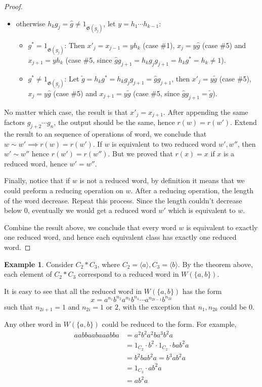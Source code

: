 \documentclass[a4paper]{article}
\theoremstyle{remark}
\theoremstyle{definition}
\newtheorem{example}{Example}
\theoremstyle{definition}
\theoremstyle{plain}
\newcommand{\gid}{\mathfrak{G}}
\begin{document}
\begin{proof}
\begin{itemize}
      \item otherwise $h_k g_j = \hat{g} \neq 1_{\gid(g_j)}$, let $y = h_1 \cdots h_{k-1}$:
        \begin{itemize}
          \item $g^* = 1_{\gid(g_j)}$: Then $x'_j = x_{j-1} = y h_k$ (case \#1), 
            $x_j = y \hat{g}$ (case \#5) and
            $x_{j+1} = y h_k$ (case \#5, since $\hat{g} g_{j+1} = h_k g_j g_{j+1} = h_k g^* = h_k \neq 1$). 
          \item $g^* \neq 1_{\gid(g_j)}$: Let $\tilde{g} = h_k g^* = h_k g_j g_{j+1} = \hat{g} g_{j+1}$, 
            then $x'_j = y \tilde{g}$ (case \#5), 
            $x_j = y \hat{g}$ (case \#5) and
            $x_{j+1} = y \tilde{g}$ (case \#5, since $\hat{g} g_{j+1} = \tilde{g}$). 
      \end{itemize}
    \end{itemize}
    No matter which case, the result is that $x'_j = x_{j+1}$.
    After appending the same factors $g_{j+2} \cdots g_n$, the output should be the same, hence
    $r(w) = r(w')$. Extend the result to an sequence of operations of word, we conclude that
    $w \sim w' \implies r(w) = r(w')$. If $w$ is equivalent to two reduced word $w', w''$,
    then $w' \sim w''$ hence $r(w') = r(w'')$. But we proved that $r(x) = x$ if $x$ is a reduced word,
    hence $w' = w''$.

    Finally, notice that if $w$ is not a reduced word, by definition it means that we could preform a reducing
    operation on $w$. After a reducing operation, the length of the word decrease. Repeat this process.
    Since the length couldn't decrease below $0$, eventually we would get a reduced word $w'$ which is equivalent to
    $w$.
    
    Combine the result above, we conclude that every word $w$ is equivalent to exactly one reduced
    word, and hence each equivalent class has exactly one reduced word.
  \end{proof}

  \begin{example}
    Consider $C_2 \ast C_3$, where $C_2 = \langle a \rangle, C_3 = \langle b \rangle$. By the
    theorem above, each element of $C_2 \ast C_3$ correspond to a reduced word in $W(\{a, b\})$.

    It is easy to see that all the reduced word in $W(\{a, b\})$ has the form
    \[ x = a^{n_1} b^{n_2} a^{n_3} b^{n_4} \cdots a^{n_{2k-1}} b^{n_{2k}} \]
    such that $n_{2i+1} = 1$ and $n_{2i} = 1 \text{ or } 2$, with the exception that
    $n_1, n_{2k}$ could be $0$.

    Any other word in $W(\{a, b\})$ could be reduced to the form. For example,
    \begin{align*}
      a a b b a a b a a a b b a &= a^2 b^2 a^2 b a^3 b^2 a \\
      &= 1_{C_2} \cdot b^2 \cdot 1_{C_2} \cdot b a b^2 a \\
      &= b^2 b a b^2 a = b^3 a b^2 a \\
      &= 1_{C_3} \cdot a b^2 a \\
      &= a b^2 a
    \end{align*}
  \end{example}
\end{document}
